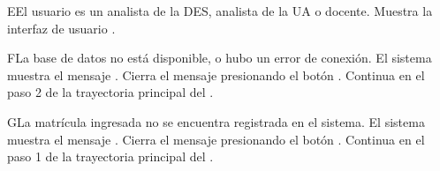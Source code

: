 
\begin{UCtrayectoriaA}{E}{El usuario es un analista de la DES, analista de la UA o docente.}
    \UCpaso Muestra la interfaz de usuario .
\end{UCtrayectoriaA}


\begin{UCtrayectoriaA}{F}{La base de datos no está disponible, o hubo un error de conexión.}
    \UCpaso El sistema muestra el mensaje .
    \UCpaso[\UCactor] Cierra el mensaje presionando el botón .
    \UCpaso Continua en el paso 2 de la trayectoria principal del .
\end{UCtrayectoriaA}


\begin{UCtrayectoriaA}{G}{La matrícula ingresada no se encuentra registrada en el sistema.}
    \UCpaso El sistema muestra el mensaje .
    \UCpaso[\UCactor] Cierra el mensaje presionando el botón .
    \UCpaso Continua en el paso 1 de la trayectoria principal del .
\end{UCtrayectoriaA}
